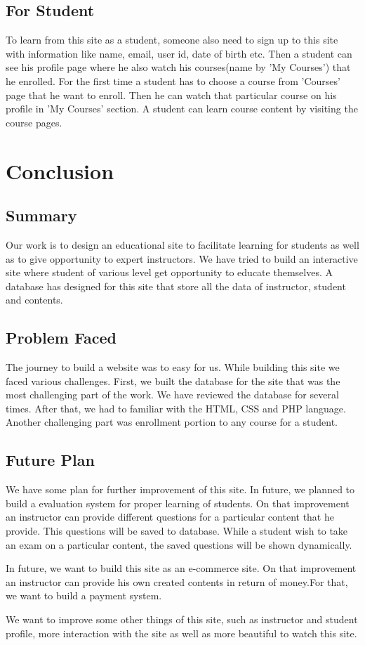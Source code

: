 \documentclass[12pt]{article}
\begin{document}
\subsection{For Student}
\par To learn from this site as a student, someone also need to sign up to this site with information like name, email, user id, date of birth etc. Then a student can see his profile page where he also watch his courses(name by 'My Courses') that he enrolled. For the first time a student has to choose a course from 'Courses' page that he want to enroll. Then he can watch that particular course on his profile in 'My Courses' section. A student can learn course content by visiting the course pages. 
%
%
\section{Conclusion}
\subsection{Summary}
\par Our work is to design an educational site to facilitate learning for students as well as to give opportunity to expert instructors. We have tried to build an interactive site where student of various level get opportunity to educate themselves. A database has designed for this site that store all the data of instructor, student and contents.
%   
\subsection{Problem Faced}
\par The journey to build a website was to easy for us. While building this site we faced various challenges. First, we built the database for the site that was the most challenging part of the work. We have reviewed the database for several times. After that, we had to familiar with the HTML, CSS and PHP language. Another challenging part was enrollment portion to any course for a student. 
%
\subsection{Future Plan}
\par We have some plan for further improvement of this site. In future, we planned to build a evaluation system for proper learning of students. On that improvement an instructor can provide different questions for a particular content that he provide. This questions will be saved to database. While a student wish to take an exam on a particular content, the saved questions will be shown dynamically.
%
\vspace{0.5cm}
%
\par  In future, we want to build this site as an e-commerce site. On that improvement an instructor can provide his own created contents in return of money.For that, we want to build a payment system.
%
\vspace{0.5cm}
%
\par We want to improve some other things of this site, such as instructor and student profile, more interaction with the site as well as more beautiful to watch this site.
\end{document}
